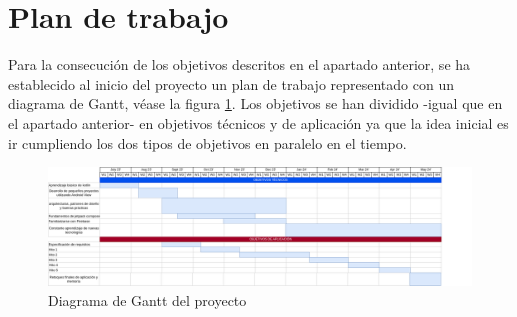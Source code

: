 \section{Plan de trabajo}
Para la consecución de los objetivos descritos en el apartado anterior, se ha establecido al inicio del proyecto un plan de trabajo representado con un diagrama de Gantt, véase la figura \ref{fig:Gantt}. Los objetivos se han dividido -igual que en el apartado anterior- en objetivos técnicos y de aplicación ya que la idea inicial es ir cumpliendo los dos tipos de objetivos en paralelo en el tiempo.
\begin{figure}[h]
	\centering
	\includegraphics[width = 1\textwidth]{Imagenes/Bitmap/Gantt_Diagram.png}
	\caption{Diagrama de Gantt del proyecto}
	\label{fig:Gantt}
\end{figure}

